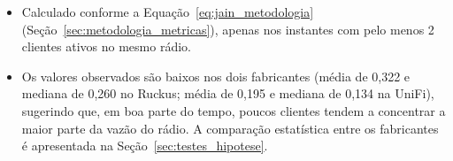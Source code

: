 \begin{enumerate}
  \begin{itemize}
    \item Calculado conforme a Equação~\ref{eq:jain_metodologia} (Seção~\ref{sec:metodologia_metricas}), apenas nos instantes com pelo menos 2 clientes ativos no mesmo rádio.
    \item Os valores observados são baixos nos dois fabricantes (média de 0,322 e mediana de 0,260 no Ruckus; média de 0,195 e mediana de 0,134 na UniFi), sugerindo que, em boa parte do tempo, poucos clientes tendem a concentrar a maior parte da vazão do rádio. A comparação estatística entre os fabricantes é apresentada na Seção~\ref{sec:testes_hipotese}.

\end{itemize}
\end{enumerate}